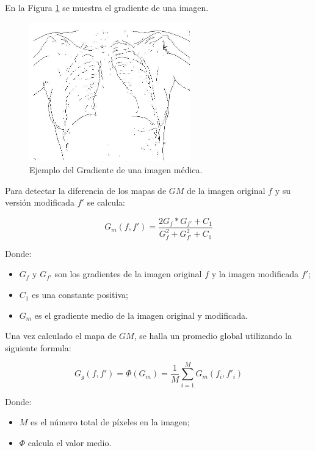 En la Figura \ref{fig:gradiente} se muestra el gradiente de una imagen.
\begin{figure}[H]
  \begin{center}
    \leavevmode
    \includegraphics[height=6cm]{gradiente_imagen1_invertida}
    \caption{Ejemplo del Gradiente de una imagen médica.}
    \label{fig:gradiente}
  \end{center}
\end{figure}

Para detectar la diferencia de los mapas de $GM$ de la imagen original $f$ y su versión modificada $f'$ se calcula:

\begin{equation}\label{eq:gm_1}
G_m(f,f') = \frac{2G_{f}  * G_{f'} + C_1}{G_{f}^{2}+G_{f'}^{2}+C_1} 
\end{equation}

Donde:
\begin{itemize}
\item $G_{f}$ y $G_{f'}$ son los gradientes de la imagen original $f$ y la imagen modificada $f'$;
\item $C_1$ es una constante positiva;
\item $G_{m}$ es el gradiente medio de la imagen original y modificada.
\end{itemize}


Una vez calculado el mapa de $GM$, se halla un promedio global utilizando la siguiente formula:
 
\begin{equation}\label{eq:gg}
G_g(f,f') = \Phi (G_m) = \frac{1}{M} \sum_{i=1}^{M}G_m(f_i,{f'}_i)
\end{equation}

Donde:
\begin{itemize}
\item $M$ es el número total de píxeles en la imagen;
\item $\Phi$ calcula el valor medio.
\end{itemize}

